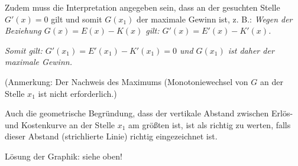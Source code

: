 \begin{langesbeispiel}
{\begin{enumerate}
Zudem muss die Interpretation angegeben sein, dass an der gesuchten Stelle $G'(x)=0$ gilt und somit $G(x_1)$ der maximale Gewinn ist, z. B.: \textit{Wegen der Beziehung $G(x)=E(x)-K(x)$ gilt: $G'(x)=E'(x)-K'(x)$.}

\textit{Somit gilt: $G'(x_1)=E'(x_1)-K'(x_1)=0$ und $G(x_1)$ ist daher der maximale Gewinn.}

(Anmerkung: Der Nachweis des Maximums (Monotoniewechsel von $G$ an der Stelle $x_1$ ist nicht erforderlich.)

Auch die geometrische Begründung, dass der vertikale Abstand zwischen Erlös- und Kostenkurve an der Stelle $x_1$ am größten ist, ist als richtig zu werten, falls dieser Abstand (strichlierte Linie) richtig eingezeichnet ist.

Lösung der Graphik: siehe oben!
		\end{enumerate}}
\end{langesbeispiel}